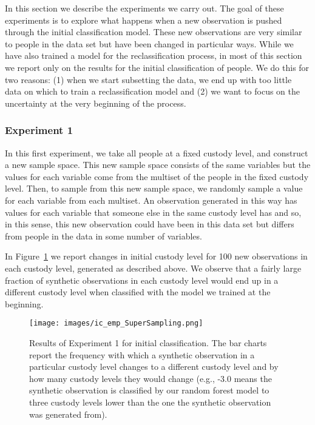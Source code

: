 \documentclass{amsproc}
\numberwithin{equation}{section}
\theoremstyle{plain}
\theoremstyle{remark}
\begin{document}
In this section we describe the experiments we carry out.  The goal of these experiments is to explore what happens when a new observation is pushed through the initial classification model.  These new observations are very similar to people in the data set but have been changed in particular ways. While we have also trained a model for the reclassification process, in most of this section we report only on the results for the initial classification of people.  We do this for two reasons:  (1) when we start subsetting the data, we end up with too little data on which to train a reclassification model and (2) we want to focus on the uncertainty at the very beginning of the process. 

\subsubsection{Experiment 1} In this first experiment, we take all people at a fixed custody level, and construct a new sample space.  This new sample space consists of the same variables but the values for each variable come from the multiset of the people in the fixed custody level.  Then, to sample from this new sample space, we randomly sample a value for each variable from each multiset.  An observation generated in this way has values for each variable that someone else in the same custody level has and so, in this sense, this new observation could have been in this data set but differs from people in the data in some number of variables.

In Figure~\ref{fig:emp-by-CL} we report changes in initial custody level for 100 new observations in each custody level, generated as described above. We observe that a fairly large fraction of synthetic observations in each custody level would end up in a different custody level when classified with the model we trained at the beginning.  

\begin{figure}
\centering
\texttt{[image: images/ic\_emp\_SuperSampling.png]}

\caption{Results of Experiment 1 for initial classification.  The bar charts report the frequency with which a synthetic observation in a particular custody level changes to a different custody level and by how many custody levels they would change (e.g., -3.0 means the synthetic observation is classified by our random forest model to three custody levels lower than the one the synthetic observation was generated from).}\label{fig:emp-by-CL}
\end{figure}
\end{document}
